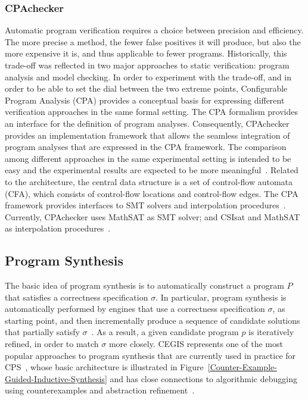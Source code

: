 \documentclass[review]{elsarticle}
\begin{document}
\subsubsection{CPAchecker}

Automatic program verification requires a choice between precision and efficiency. 
The more precise a method, the fewer false positives it will produce, but also the 
more expensive it is, and thus applicable to fewer programs. 
Historically, this trade-off was reflected in two major approaches to static verification: 
program analysis and model checking. In order to experiment with the trade-off, 
and in order to be able to set the dial between the two extreme points, 
Configurable Program Analysis (CPA) provides a conceptual basis for expressing 
different verification approaches in the same formal setting. The CPA formalism 
provides an interface for the definition of program analyses. Consequently, CPAchecker 
provides an implementation framework that allows the seamless integration of program 
analyses that are expressed in the CPA framework. The comparison among different 
approaches in the same experimental setting is intended to be easy and the experimental 
results are expected to be more meaningful~\citep{Beyer2011}. Related to the architecture, 
the central data structure is a set of control-flow automata (CFA), which consists of control-flow 
locations and control-flow edges. The CPA framework provides interfaces to SMT solvers and 
interpolation procedures~\citep{Beyer2011}. Currently, CPAchecker uses MathSAT as SMT solver; 
and CSIsat and MathSAT as interpolation procedures~\cite{Beyer2011}. 

\subsection{Program Synthesis}
\label{sec:ProgramSynthesis}

The basic idea of program synthesis is to automatically construct a program $P$ that satisfies a correctness specification $\sigma$. In particular, program synthesis is automatically performed by engines that use a correctness specification $\sigma$, as starting point, and then incrementally produce a sequence of candidate solutions that partially satisfy $\sigma$~\cite{Abateetal2017}. As a result, a given candidate program $p$ is iteratively refined, in order to match $\sigma$ more closely. CEGIS represents one of the most popular approaches to program synthesis that are currently used in practice for CPS~\cite{Abateetal2017}, whose basic architecture is illustrated in Figure~\ref{Counter-Example-Guided-Inductive-Synthesis} and has close connections to algorithmic debugging using counterexamples and abstraction refinement~\cite{Alur}. 
\end{document}
